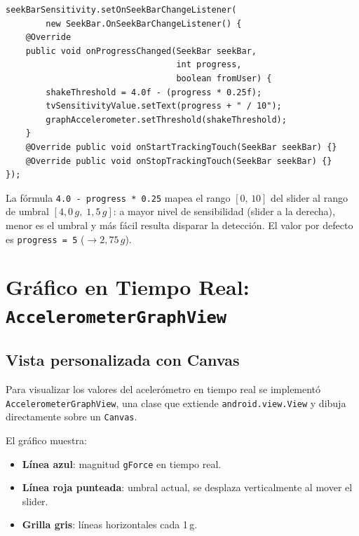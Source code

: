 \documentclass[12pt, a4paper]{article}
\begin{document}
\begin{lstlisting}[caption={Ajuste din\'amico del umbral desde el \texttt{SeekBar} --- \texttt{MainActivity.java}}]
seekBarSensitivity.setOnSeekBarChangeListener(
        new SeekBar.OnSeekBarChangeListener() {
    @Override
    public void onProgressChanged(SeekBar seekBar,
                                  int progress,
                                  boolean fromUser) {
        shakeThreshold = 4.0f - (progress * 0.25f);
        tvSensitivityValue.setText(progress + " / 10");
        graphAccelerometer.setThreshold(shakeThreshold);
    }
    @Override public void onStartTrackingTouch(SeekBar seekBar) {}
    @Override public void onStopTrackingTouch(SeekBar seekBar) {}
});
\end{lstlisting}

La f\'ormula \texttt{4.0 - progress * 0.25} mapea el rango $[0,\,10]$ del
slider al rango de umbral $[4{,}0\,g,\;1{,}5\,g]$: a mayor nivel de
sensibilidad (slider a la derecha), menor es el umbral y m\'as f\'acil resulta
disparar la detecci\'on. El valor por defecto es \texttt{progress = 5}
($\rightarrow 2{,}75\,g$).

\section{Gr\'afico en Tiempo Real: \texttt{AccelerometerGraphView}}

\subsection{Vista personalizada con Canvas}

Para visualizar los valores del aceler\'ometro en tiempo real se implement\'o
\texttt{AccelerometerGraphView}, una clase que extiende
\texttt{android.view.View} y dibuja directamente sobre un \texttt{Canvas}.

El gr\'afico muestra:
\begin{itemize}
  \item \textbf{L\'inea azul}: magnitud \texttt{gForce} en tiempo real.
  \item \textbf{L\'inea roja punteada}: umbral actual, se desplaza
        verticalmente al mover el slider.
  \item \textbf{Grilla gris}: l\'ineas horizontales cada 1\,g.
\end{itemize}
\end{document}

